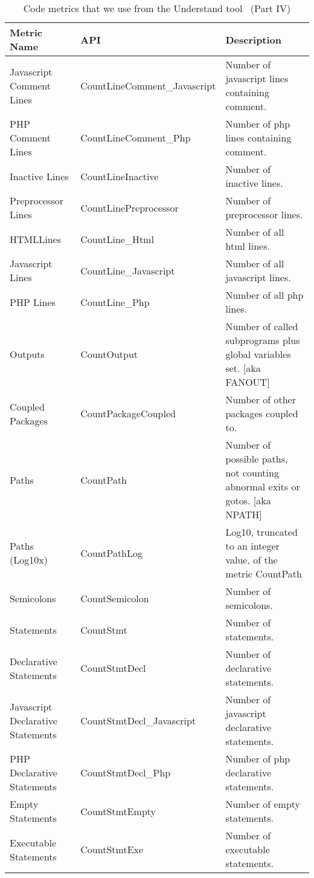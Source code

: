 \begin{table}
	\centering
	\scriptsize
	\caption{Code metrics that we use from the Understand tool~\cite{understand} (Part IV)\label{table:code_metrics4}}
	\begin{tabular}{p{}p{}p{}}
		\hline
		{\bfseries Metric Name} & {\bfseries API} & {\bfseries Description}\\
		\hline
		Javascript Comment Lines & CountLineComment\_Javascript & Number of javascript lines containing comment.\\
		PHP Comment Lines & CountLineComment\_Php & Number of php lines containing comment.\\
		Inactive Lines & CountLineInactive & Number of inactive lines.\\
		Preprocessor Lines & CountLinePreprocessor & Number of preprocessor lines.\\
		HTMLLines & CountLine\_Html & Number of all html lines.\\
		Javascript Lines & CountLine\_Javascript & Number of all javascript lines.\\
		PHP Lines & CountLine\_Php & Number of all php lines.\\
		Outputs & CountOutput & Number of called subprograms plus global variables set. [aka FANOUT]\\
		Coupled Packages & CountPackageCoupled & Number of other packages coupled to.\\
		Paths & CountPath & Number of possible paths, not counting abnormal exits or gotos. [aka NPATH]\\
		Paths (Log10x) & CountPathLog & Log10, truncated to an integer value, of the metric CountPath\\
		Semicolons & CountSemicolon & Number of semicolons.\\
		Statements & CountStmt & Number of statements.\\
		Declarative Statements & CountStmtDecl & Number of declarative statements.\\
		Javascript Declarative Statements & CountStmtDecl\_Javascript & Number of javascript declarative statements.\\
		PHP Declarative Statements & CountStmtDecl\_Php & Number of php declarative statements.\\
		Empty Statements & CountStmtEmpty & Number of empty statements.\\
		Executable Statements & CountStmtExe & Number of executable statements.\\

\end{tabular}
\end{table}

